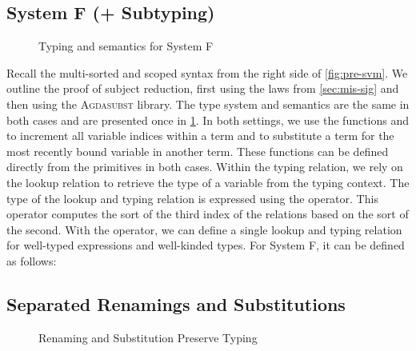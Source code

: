 \documentclass[screen,nonacm]{acmart}
\begin{document}
\subsection{System F (+ Subtyping)}\label{sec:ext-syf}

\begin{figure}[!t]
      \centering
      \begin{minipage}[t]{0.48\linewidth}
            \raggedright{}
            \ETyping{}
      \end{minipage}
      \hfill
      \begin{minipage}[t]{0.48\linewidth}
            \raggedright{}
            \ESemantics{}
      \end{minipage}
      \caption{Typing and semantics for System F}\label{fig:ext-tas}
\end{figure}

Recall the multi-sorted and scoped syntax from the right side of
\cref{fig:pre-svm}. We outline the proof of subject reduction, first using the
laws from \cref{sec:mis-sig} and then using the \textsc{Agdasubst} library. The
type system and semantics are the same in both cases and are presented once in
\cref{fig:ext-tas}. In both settings, we use the functions \EWk{} and \ESubst{}
to increment all variable indices within a term and to substitute a term for
the most recently bound variable in another term. These functions can be
defined directly from the primitives in both cases. Within the typing relation,
we rely on the lookup relation \ELookup{} to retrieve the type of a variable
from the typing context. The type of the lookup and typing relation is
expressed using the  operator. This operator computes the
sort of the third index of the relations based on the sort of the second. With
the  operator, we can define a single lookup and typing
relation for well-typed expressions and well-kinded types. For System F, it can
be defined as follows:

\noindent\begin{minipage}[t]{0.48\linewidth}
      \raggedright{}
      \EUpArrow{}
\end{minipage}
\begin{minipage}[t]{0.48\linewidth}
      \raggedright{}
      \ETypeOf{}
\end{minipage}

\subsection*{Separated Renamings and Substitutions}
\begin{figure}[!t]
      \centering
      \begin{minipage}[t]{0.48\linewidth}
            \raggedright{}
            \ERPT{}
      \end{minipage}
      \begin{minipage}[t]{0.48\linewidth}
            \raggedright{}
            \ESPT{}
      \end{minipage}
      \caption{Renaming and Substitution Preserve Typing}\label{fig:ext-rst}
\end{figure}
\end{document}
